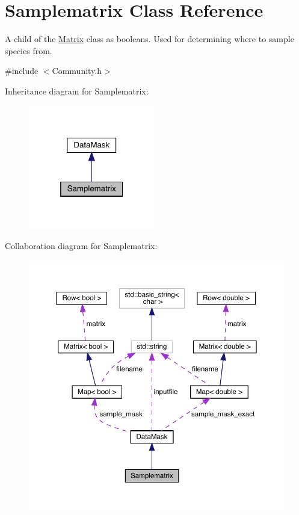\hypertarget{class_samplematrix}{}\section{Samplematrix Class Reference}
\label{class_samplematrix}


A child of the \hyperlink{class_matrix}{Matrix} class as booleans. Used for determining where to sample species from.  




{\ttfamily \#include $<$Community.\+h$>$}



Inheritance diagram for Samplematrix\+:
\nopagebreak
\begin{figure}[H]
\begin{center}
\leavevmode
\includegraphics[width=157pt]{class_samplematrix__inherit__graph}
\end{center}
\end{figure}


Collaboration diagram for Samplematrix\+:
\nopagebreak
\begin{figure}[H]
\begin{center}
\leavevmode
\includegraphics[width=350pt]{class_samplematrix__coll__graph}
\end{center}
\end{figure}
